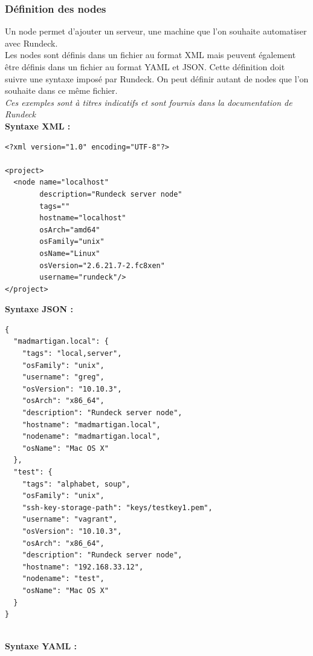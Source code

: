 \documentclass[12pt]{article}
\begin{document}
\subsubsection{Définition des nodes}
Un node permet d'ajouter un serveur, une machine que l'on souhaite automatiser avec Rundeck.
\\
Les nodes sont définis dans un fichier au format XML mais peuvent également être définis dans un fichier au format YAML et JSON. Cette définition doit suivre une syntaxe imposé par Rundeck. On peut définir autant de nodes que l'on souhaite dans ce même fichier.
\vspace{0.5cm}
\\
\textit{Ces exemples sont à titres indicatifs et sont fournis dans la documentation de Rundeck}
\vspace{0.5cm}
\\
\textbf{Syntaxe XML :}
\\
\begin{lstlisting}
<?xml version="1.0" encoding="UTF-8"?>

<project>
  <node name="localhost" 
        description="Rundeck server node" 
        tags="" 
        hostname="localhost" 
        osArch="amd64" 
        osFamily="unix" 
        osName="Linux" 
        osVersion="2.6.21.7-2.fc8xen" 
        username="rundeck"/>
</project>
\end{lstlisting}

\vspace{0.5cm}
\textbf{Syntaxe JSON :}
\\

\begin{lstlisting}
{
  "madmartigan.local": {
    "tags": "local,server",
    "osFamily": "unix",
    "username": "greg",
    "osVersion": "10.10.3",
    "osArch": "x86_64",
    "description": "Rundeck server node",
    "hostname": "madmartigan.local",
    "nodename": "madmartigan.local",
    "osName": "Mac OS X"
  },
  "test": {
    "tags": "alphabet, soup",
    "osFamily": "unix",
    "ssh-key-storage-path": "keys/testkey1.pem",
    "username": "vagrant",
    "osVersion": "10.10.3",
    "osArch": "x86_64",
    "description": "Rundeck server node",
    "hostname": "192.168.33.12",
    "nodename": "test",
    "osName": "Mac OS X"
  }
}
\end{lstlisting}

\vspace{0.5cm}
\\
\textbf{Syntaxe YAML :}
\\
\end{document}

